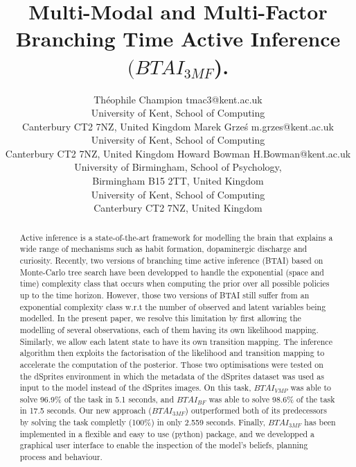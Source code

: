 \documentclass[twoside,11pt]{article}
\begin{document}
\title{Multi-Modal and Multi-Factor Branching Time Active Inference $(BTAI_{3MF}$).}

\author{\name Théophile Champion \email tmac3@kent.ac.uk \\
       \addr University of Kent, School of Computing\\
       Canterbury CT2 7NZ, United Kingdom
       \AND
       \name Marek Grze\'s \email m.grzes@kent.ac.uk \\
       \addr University of Kent, School of Computing\\
       Canterbury CT2 7NZ, United Kingdom
       \AND
       \name Howard Bowman \email H.Bowman@kent.ac.uk \\
       \addr University of Birmingham, School of Psychology,\\
       Birmingham B15 2TT, United Kingdom\\
       University of Kent, School of Computing\\
       Canterbury CT2 7NZ, United Kingdom
       }
       

\maketitle

\begin{abstract}%
Active inference is a state-of-the-art framework for modelling the brain that explains a wide range of mechanisms such as habit formation, dopaminergic discharge and curiosity. Recently, two versions of branching time active inference (BTAI) based on Monte-Carlo tree search have been developped to handle the exponential (space and time) complexity class that occurs when computing the prior over all possible policies up to the time horizon. However, those two versions of BTAI still suffer from an exponential complexity class w.r.t the number of observed and latent variables being modelled. In the present paper, we resolve this limitation by first allowing the modelling of several observations, each of them having its own likelihood mapping. Similarly, we allow each latent state to have its own transition mapping. The inference algorithm then exploits the factorisation of the likelihood and transition mapping to accelerate the computation of the posterior. Those two optimisations were tested on the dSprites environment in which the metadata of the dSprites dataset was used as input to the model instead of the dSprites images. On this task, $BTAI_{VMP}$ \citep{AITS_THEORY, AITS_PRACTICE} was able to solve 96.9\% of the task in 5.1 seconds, and $BTAI_{BF}$ \citep{BTAI_BF} was able to solve 98.6\% of the task in 17.5 seconds. Our new approach ($BTAI_{3MF}$) outperformed both of its predecessors by solving the task completly (100\%) in only 2.559 seconds. Finally, $BTAI_{3MF}$ has been implemented in a flexible and easy to use (python) package, and we developped a graphical user interface to enable the inspection of the model's beliefs, planning process and behaviour.
\end{abstract}
\end{document}
